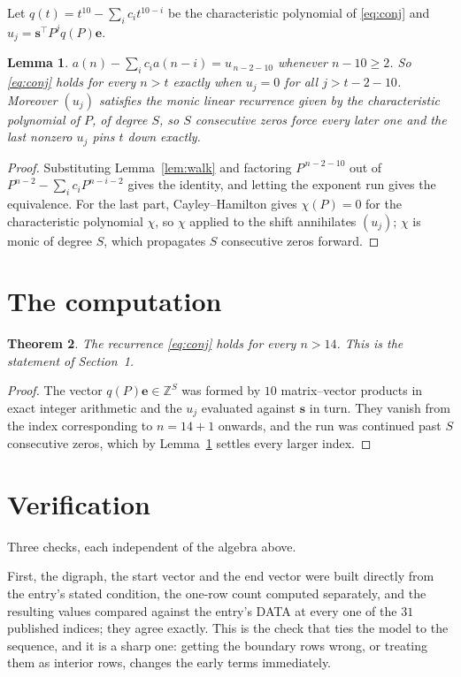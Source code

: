 \documentclass[11pt,a4paper]{article}
\theoremstyle{plain}
\newtheorem{theorem}{Theorem}
\newtheorem{lemma}[theorem]{Lemma}
\theoremstyle{definition}
\begin{document}
Let $q(t)=t^{10}-\sum_i c_i t^{10-i}$ be the characteristic polynomial of
\eqref{eq:conj} and $u_j=\mathbf{s}^{\!\top}P^{j}q(P)\mathbf{e}$.

\begin{lemma}\label{lem:crit}
$a(n)-\sum_i c_i a(n-i)=u_{\,n-2-10}$ whenever $n-10\ge2$. So \eqref{eq:conj}
holds for every $n>t$ exactly when $u_j=0$ for all $j>t-2-10$. Moreover $(u_j)$
satisfies the monic linear recurrence given by the characteristic polynomial of $P$, of
degree $S$, so $S$ consecutive zeros force every later one and the last nonzero $u_j$ pins
$t$ down exactly.
\end{lemma}

\begin{proof}
Substituting Lemma~\ref{lem:walk} and factoring $P^{\,n-2-10}$ out of
$P^{n-2}-\sum_i c_i P^{n-i-2}$ gives the identity, and letting the exponent run gives the
equivalence. For the last part, Cayley--Hamilton gives $\chi(P)=0$ for the characteristic
polynomial $\chi$, so $\chi$ applied to the shift annihilates $(u_j)$; $\chi$ is monic of
degree $S$, which propagates $S$ consecutive zeros forward.
\end{proof}

\section{The computation}

\begin{theorem}
The recurrence \eqref{eq:conj} holds for every $n>14$. This is the statement of
Section~1.
\end{theorem}

\begin{proof}
The vector $q(P)\mathbf{e}\in\mathbb{Z}^{S}$ was formed by $10$ matrix--vector
products in exact integer arithmetic and the $u_j$ evaluated against $\mathbf{s}$ in turn.
They vanish from the index corresponding to $n=14+1$ onwards, and the run was continued
past $S$ consecutive zeros, which by Lemma~\ref{lem:crit} settles every larger index.
\end{proof}

\section{Verification}

Three checks, each independent of the algebra above.

First, the digraph, the start vector and the end vector were built directly from the
entry's stated condition, the one-row count computed separately, and the resulting values
compared against the entry's DATA at every one of the $31$ published indices; they
agree exactly. This is the check that ties the model to the sequence, and it is a sharp one:
getting the boundary rows wrong, or treating them as interior rows, changes the early terms
immediately.
\end{document}
